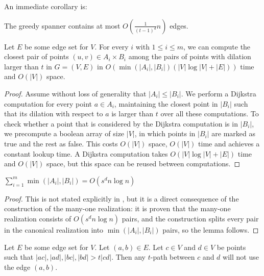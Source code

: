 \documentclass[runningheads,envcountsame,oribibl,orivec]{llncs}
\begin{document}
An immediate corollary is:

\begin{observation} \label{observation:greedyedges}
 The greedy spanner contains at most $O\left(\frac{1}{(t-1)^d} n\right)$ edges.
\end{observation}

\begin{lemma} \label{lemma:dijkstra}
Let $E$ be some edge set for $V$. For every $i$ with $1 \leq i \leq m$, we can compute the closest pair of points $(u, v) \in A_i \times B_i$ among the pairs of points with dilation larger than $t$ in $G=(V, E)$ in $O(\min(|A_i|, |B_i|)(|V|\log|V| + |E|))$ time and $O(|V|)$ space.
\end{lemma}

\begin{proof}
Assume without loss of generality that $|A_i| \leq |B_i|$. We perform a Dijkstra computation for every point $a \in A_i$, maintaining the closest point in $|B_i|$ such that its dilation with respect to $a$ is larger than $t$ over all these computations. To check whether a point that is considered by the Dijkstra computation is in $|B_i|$, we precompute a boolean array of size $|V|$, in which points in $|B_i|$ are marked as true and the rest as false. This costs $O(|V|)$ space, $O(|V|)$ time and achieves a constant lookup time. A Dijkstra computation takes $O(|V|\log|V|+|E|)$ time and $O(|V|)$ space, but this space can be reused between computations.
\end{proof}

\begin{fact}\label{fact:manyone}
$\sum_{i=1}^m \min(|A_i|, |B_i|) = O(s^d n \log n)$
\end{fact}
\begin{proof}
This is not stated explicitly in \cite{Callahan95dealingwith}, but it is a direct consequence of the construction of the many-one realization: it is proven that the many-one realization consists of $O(s^d n \log n)$ pairs, and the construction splits every pair in the canonical realization into $\min(|A_i|, |B_i|)$ pairs, so the lemma follows.
\end{proof}

\begin{observation} \label{observation:faraway}
Let $E$ be some edge set for $V$. Let $(a, b) \in E$. Let $c \in V$ and $d \in V$ be points such that $|ac|, |ad|, |bc|, |bd| > t|cd|$. Then any $t$-path between $c$ and $d$ will not use the edge $(a, b)$.
\end{observation}
\end{document}
